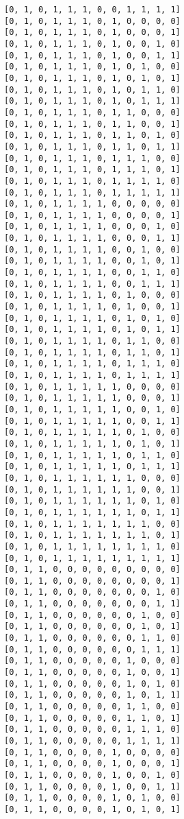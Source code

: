 \documentclass[11pt]{article}
\begin{document}
\begin{Verbatim}[commandchars=\\\{\}]
[0, 1, 0, 1, 1, 1, 0, 0, 1, 1, 1, 1]
[0, 1, 0, 1, 1, 1, 0, 1, 0, 0, 0, 0]
[0, 1, 0, 1, 1, 1, 0, 1, 0, 0, 0, 1]
[0, 1, 0, 1, 1, 1, 0, 1, 0, 0, 1, 0]
[0, 1, 0, 1, 1, 1, 0, 1, 0, 0, 1, 1]
[0, 1, 0, 1, 1, 1, 0, 1, 0, 1, 0, 0]
[0, 1, 0, 1, 1, 1, 0, 1, 0, 1, 0, 1]
[0, 1, 0, 1, 1, 1, 0, 1, 0, 1, 1, 0]
[0, 1, 0, 1, 1, 1, 0, 1, 0, 1, 1, 1]
[0, 1, 0, 1, 1, 1, 0, 1, 1, 0, 0, 0]
[0, 1, 0, 1, 1, 1, 0, 1, 1, 0, 0, 1]
[0, 1, 0, 1, 1, 1, 0, 1, 1, 0, 1, 0]
[0, 1, 0, 1, 1, 1, 0, 1, 1, 0, 1, 1]
[0, 1, 0, 1, 1, 1, 0, 1, 1, 1, 0, 0]
[0, 1, 0, 1, 1, 1, 0, 1, 1, 1, 0, 1]
[0, 1, 0, 1, 1, 1, 0, 1, 1, 1, 1, 0]
[0, 1, 0, 1, 1, 1, 0, 1, 1, 1, 1, 1]
[0, 1, 0, 1, 1, 1, 1, 0, 0, 0, 0, 0]
[0, 1, 0, 1, 1, 1, 1, 0, 0, 0, 0, 1]
[0, 1, 0, 1, 1, 1, 1, 0, 0, 0, 1, 0]
[0, 1, 0, 1, 1, 1, 1, 0, 0, 0, 1, 1]
[0, 1, 0, 1, 1, 1, 1, 0, 0, 1, 0, 0]
[0, 1, 0, 1, 1, 1, 1, 0, 0, 1, 0, 1]
[0, 1, 0, 1, 1, 1, 1, 0, 0, 1, 1, 0]
[0, 1, 0, 1, 1, 1, 1, 0, 0, 1, 1, 1]
[0, 1, 0, 1, 1, 1, 1, 0, 1, 0, 0, 0]
[0, 1, 0, 1, 1, 1, 1, 0, 1, 0, 0, 1]
[0, 1, 0, 1, 1, 1, 1, 0, 1, 0, 1, 0]
[0, 1, 0, 1, 1, 1, 1, 0, 1, 0, 1, 1]
[0, 1, 0, 1, 1, 1, 1, 0, 1, 1, 0, 0]
[0, 1, 0, 1, 1, 1, 1, 0, 1, 1, 0, 1]
[0, 1, 0, 1, 1, 1, 1, 0, 1, 1, 1, 0]
[0, 1, 0, 1, 1, 1, 1, 0, 1, 1, 1, 1]
[0, 1, 0, 1, 1, 1, 1, 1, 0, 0, 0, 0]
[0, 1, 0, 1, 1, 1, 1, 1, 0, 0, 0, 1]
[0, 1, 0, 1, 1, 1, 1, 1, 0, 0, 1, 0]
[0, 1, 0, 1, 1, 1, 1, 1, 0, 0, 1, 1]
[0, 1, 0, 1, 1, 1, 1, 1, 0, 1, 0, 0]
[0, 1, 0, 1, 1, 1, 1, 1, 0, 1, 0, 1]
[0, 1, 0, 1, 1, 1, 1, 1, 0, 1, 1, 0]
[0, 1, 0, 1, 1, 1, 1, 1, 0, 1, 1, 1]
[0, 1, 0, 1, 1, 1, 1, 1, 1, 0, 0, 0]
[0, 1, 0, 1, 1, 1, 1, 1, 1, 0, 0, 1]
[0, 1, 0, 1, 1, 1, 1, 1, 1, 0, 1, 0]
[0, 1, 0, 1, 1, 1, 1, 1, 1, 0, 1, 1]
[0, 1, 0, 1, 1, 1, 1, 1, 1, 1, 0, 0]
[0, 1, 0, 1, 1, 1, 1, 1, 1, 1, 0, 1]
[0, 1, 0, 1, 1, 1, 1, 1, 1, 1, 1, 0]
[0, 1, 0, 1, 1, 1, 1, 1, 1, 1, 1, 1]
[0, 1, 1, 0, 0, 0, 0, 0, 0, 0, 0, 0]
[0, 1, 1, 0, 0, 0, 0, 0, 0, 0, 0, 1]
[0, 1, 1, 0, 0, 0, 0, 0, 0, 0, 1, 0]
[0, 1, 1, 0, 0, 0, 0, 0, 0, 0, 1, 1]
[0, 1, 1, 0, 0, 0, 0, 0, 0, 1, 0, 0]
[0, 1, 1, 0, 0, 0, 0, 0, 0, 1, 0, 1]
[0, 1, 1, 0, 0, 0, 0, 0, 0, 1, 1, 0]
[0, 1, 1, 0, 0, 0, 0, 0, 0, 1, 1, 1]
[0, 1, 1, 0, 0, 0, 0, 0, 1, 0, 0, 0]
[0, 1, 1, 0, 0, 0, 0, 0, 1, 0, 0, 1]
[0, 1, 1, 0, 0, 0, 0, 0, 1, 0, 1, 0]
[0, 1, 1, 0, 0, 0, 0, 0, 1, 0, 1, 1]
[0, 1, 1, 0, 0, 0, 0, 0, 1, 1, 0, 0]
[0, 1, 1, 0, 0, 0, 0, 0, 1, 1, 0, 1]
[0, 1, 1, 0, 0, 0, 0, 0, 1, 1, 1, 0]
[0, 1, 1, 0, 0, 0, 0, 0, 1, 1, 1, 1]
[0, 1, 1, 0, 0, 0, 0, 1, 0, 0, 0, 0]
[0, 1, 1, 0, 0, 0, 0, 1, 0, 0, 0, 1]
[0, 1, 1, 0, 0, 0, 0, 1, 0, 0, 1, 0]
[0, 1, 1, 0, 0, 0, 0, 1, 0, 0, 1, 1]
[0, 1, 1, 0, 0, 0, 0, 1, 0, 1, 0, 0]
[0, 1, 1, 0, 0, 0, 0, 1, 0, 1, 0, 1]

\end{Verbatim}
\end{document}
